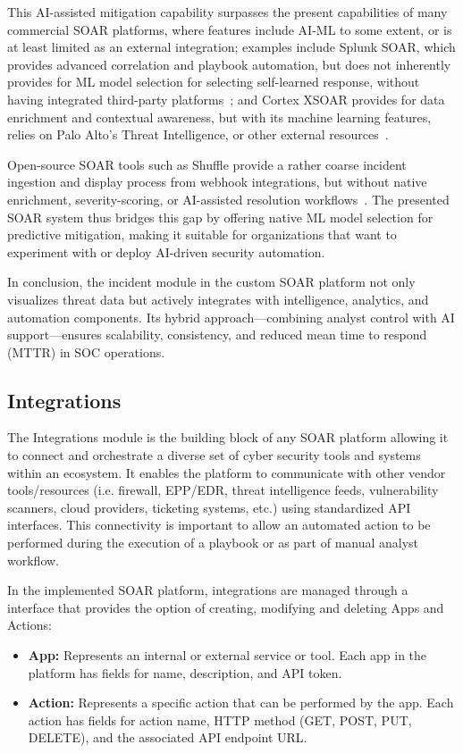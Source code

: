 This AI-assisted mitigation capability surpasses the present capabilities of many commercial SOAR platforms, where features include AI-ML to some extent, or is at least limited as an external integration; examples include Splunk SOAR, which provides advanced correlation and playbook automation, but does not inherently provides for ML model selection for selecting self-learned response, without having integrated third-party platforms~\cite{splunk}; and Cortex XSOAR provides for data enrichment and contextual awareness, but with its machine learning features, relies on Palo Alto’s Threat Intelligence, or other external resources~\cite{paloalto}.

Open-source SOAR tools such as Shuffle provide a rather coarse incident ingestion and display process from webhook integrations, but without native enrichment, severity-scoring, or AI-assisted resolution workflows~\cite{techtarget}. The presented SOAR system thus bridges this gap by offering native ML model selection for predictive mitigation, making it suitable for organizations that want to experiment with or deploy AI-driven security automation.

In conclusion, the incident module in the custom SOAR platform not only visualizes threat data but actively integrates with intelligence, analytics, and automation components. Its hybrid approach—combining analyst control with AI support—ensures scalability, consistency, and reduced mean time to respond (MTTR) in SOC operations.

\subsection{Integrations}

The Integrations module is the building block of any SOAR platform allowing it to connect and orchestrate a diverse set of cyber security tools and systems within an ecosystem. It enables the platform to communicate with other vendor tools/resources (i.e. firewall, EPP/EDR, threat intelligence feeds, vulnerability scanners, cloud providers, ticketing systems, etc.) using standardized API interfaces. This connectivity is important to allow an automated action to be performed during the execution of a playbook or as part of manual analyst workflow. 

In the implemented SOAR platform, integrations are managed through a interface that provides the option of creating, modifying and deleting Apps and Actions:

\begin{itemize}[noitemsep,topsep=0pt]
    \item \textbf{App:} Represents an internal or external service or tool. Each app in the platform has fields for name, description, and API token.
    \item \textbf{Action:} Represents a specific action that can be performed by the app. Each action has fields for action name, HTTP method (GET, POST, PUT, DELETE), and the associated API endpoint URL.
\end{itemize}


